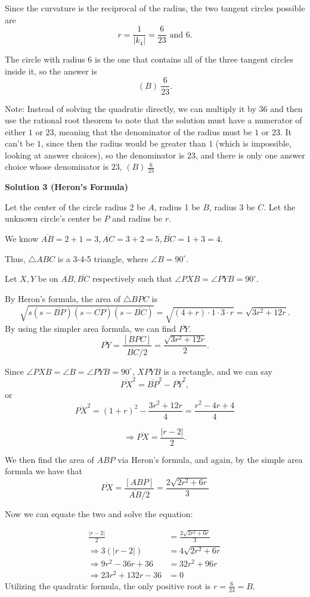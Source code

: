 \begin{enumerate}
 Since the curvature is the reciprocal of the radius, the two tangent circles possible are
 \[r = \frac{1}{|k_4|} = \frac{6}{23} \text{ and } 6.\]

 The circle with radius 6 is the one that contains all of the three tangent circles inside it, so the answer is
 \[\boxed{(B)\ \frac{6}{23}}.\]

 Note: Instead of solving the quadratic directly, we can multiply it by $36$ and then use the rational root theorem to note that the solution must have a numerator of either $1$ or $23$, meaning that the denominator of the radius must be $1$ or $23$. It can't be $1$, since then the radius would be greater than $1$ (which is impossible, looking at answer choices), so the denominator is $23$, and there is only one answer choice whose denominator is $23$, $\boxed{(B)\ \frac{6}{23}}$




\textbf{Solution 3 (Heron's Formula)}

Let the center of the circle radius 2 be $A$, radius 1 be $B$, radius 3 be $C$. Let the unknown circle's center be $P$ and radius be $r$.

 We know $\overline{AB}=2+1=3, \overline{AC}=3+2=5, \overline{BC}=1+3=4.$

 Thus, $\triangle ABC$ is a 3-4-5 triangle, where $\angle B=90^\circ$.

 Let $X,Y$ be on $\overline{AB},\overline{BC}$ respectively such that $\angle{PXB}=\angle{PYB}=90^\circ$.

 By Heron's formula, the area of $\triangle BPC$ is 
 \[\sqrt{s(s-\overline{BP})(s-\overline{CP})(s-\overline{BC})}=\sqrt{(4+r)\cdot 1\cdot 3\cdot r}=\sqrt{3r^2+12r}.\]By using the simpler area formula, we can find $\overline{PY}$.
 \[\overline{PY}=\frac{[BPC]}{\overline{BC}/2}=\frac{\sqrt{3r^2+12r}}{2}.\] 

 Since $\angle{PXB}=\angle{B}=\angle{PYB}=90^\circ$, $XPYB$ is a rectangle, and we can say 
 \[\overline{PX}^2=\overline{BP}^2-\overline{PY}^2,\]or
 \[\overline{PX}^2=(1+r)^2-\frac{3r^2+12r}{4}=\frac{r^2-4r+4}{4}\]

 \[\Rightarrow \overline{PX}=\frac{|r-2|}{2}.\]

 We then find the area of $ABP$ via Heron's formula, and again, by the simple area formula we have that
 \[\overline{PX}=\frac{[ABP]}{\overline{AB}/2}=\frac{2\sqrt{2r^2+6r}}{3}\]

 Now we can equate the two and solve the equation:

 
 \begin{align*} \frac{|r-2|}{2}&=\frac{2\sqrt{2r^2+6r}}{3} \\ \Rightarrow 3(|r-2|)&=4\sqrt{2r^2+6r} \\ \Rightarrow 9r^2-36r+36&=32r^2+96r \\ \Rightarrow 23r^2+132r-36&=0 \end{align*}
Utilizing the quadratic formula, the only positive root is $r=\frac{6}{23}=\boxed{B}.$


\end{enumerate}
